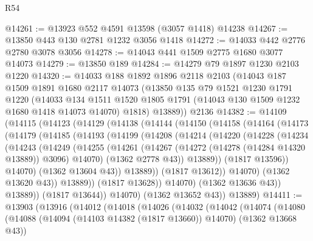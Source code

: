 \begin{lexlean}{R54}
\begin{coremodule}
@14261 := @13923 @552 @4591 @13598 (@3057 @1418) @14238
@14267 := @13850 @443 @130 @2781 @1232 @3056 @1418
@14272 := @14033 @442 @2776 @2780 @3078 @3056
@14278 := @14043 @441 @1509 @2775 @1680 @3077 @14073
@14279 := @13850 @189
@14284 := @14279 @79 @1897 @1230 @2103 @1220
@14320 := @14033
    @188
    @1892
    @1896
    @2118
    @2103
    (@14043
      @187
      @1509
      @1891
      @1680
      @2117
      @14073
      (@13850
        @135
        @79
        @1521
        @1230
        @1791
        @1220
        (@14033
          @134
          @1511
          @1520
          @1805
          @1791
          (@14043 @130 @1509 @1232 @1680 @1418 @14073 @14070)
          @1818)
        @13889))
    @2136
@14382 := @14109
    (@14115
      (@14123
        (@14129
          (@14138
            (@14144
              (@14150
                (@14158
                  (@14164
                    (@14173
                      (@14179
                        (@14185
                          (@14193
                            (@14199
                              (@14208
                                (@14214
                                  (@14220
                                    (@14228
                                      (@14234
                                        (@14243
                                          (@14249
                                            (@14255
                                              (@14261
                                                (@14267
                                                  (@14272 (@14278 (@14284 @14320 @13889)) @3096)
                                                  @14070)
                                                (@1362 @2778 @43))
                                              @13889))
                                          (@1817 @13596))
                                        @14070)
                                      (@1362 @13604 @43))
                                    @13889))
                                (@1817 @13612))
                              @14070)
                            (@1362 @13620 @43))
                          @13889))
                      (@1817 @13628))
                    @14070)
                  (@1362 @13636 @43))
                @13889))
            (@1817 @13644))
          @14070)
        (@1362 @13652 @43))
      @13889)
@14411 := @13903
    (@13916
      (@14012
        (@14018
          (@14026
            (@14032
              (@14042
                (@14074
                  (@14080
                    (@14088 (@14094 (@14103 @14382 (@1817 @13660)) @14070) (@1362 @13668 @43))

\end{coremodule}
\end{lexlean}

